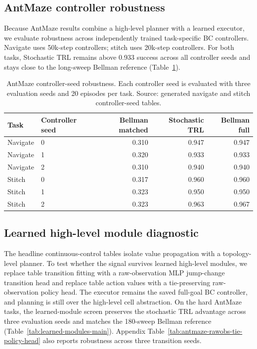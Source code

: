 \documentclass[10pt]{article}
\begin{document}
\subsection{AntMaze controller robustness}

Because AntMaze results combine a high-level planner with a learned executor,
we evaluate robustness across independently trained task-specific BC
controllers. Navigate uses 50k-step controllers; stitch uses 20k-step
controllers. For both tasks, Stochastic TRL remains above 0.933 success across
all controller seeds and stays close to the long-sweep Bellman reference
(Table~\ref{tab:controllers}).

\begin{table}[t]
\centering
\caption{AntMaze controller-seed robustness. Each controller seed is evaluated
with three evaluation seeds and 20 episodes per task. Source: generated
navigate and stitch controller-seed tables.}
\label{tab:controllers}
\begin{tabular}{llrrr}
\toprule
Task & Controller seed & Bellman matched & Stochastic TRL & Bellman full\\
\midrule
Navigate & 0 & 0.310 & 0.947 & 0.947\\
Navigate & 1 & 0.320 & 0.933 & 0.933\\
Navigate & 2 & 0.310 & 0.940 & 0.940\\
Stitch & 0 & 0.317 & 0.960 & 0.960\\
Stitch & 1 & 0.323 & 0.950 & 0.950\\
Stitch & 2 & 0.323 & 0.963 & 0.967\\
\bottomrule
\end{tabular}
\end{table}

\subsection{Learned high-level module diagnostic}

The headline continuous-control tables isolate value propagation with a
topology-level planner. To test whether the signal survives learned high-level
modules, we replace table transition fitting with a raw-observation MLP
jump-change transition head and replace table action values with a
tie-preserving raw-observation policy head. The executor remains the saved
full-goal BC controller, and planning is still over the high-level cell
abstraction. On the hard AntMaze tasks, the learned-module screen preserves
the stochastic TRL advantage across three evaluation seeds and matches the
180-sweep Bellman reference (Table~\ref{tab:learned-modules-main}). Appendix
Table~\ref{tab:antmaze-rawobs-tie-policy-head} also reports robustness across
three transition seeds.
\end{document}

